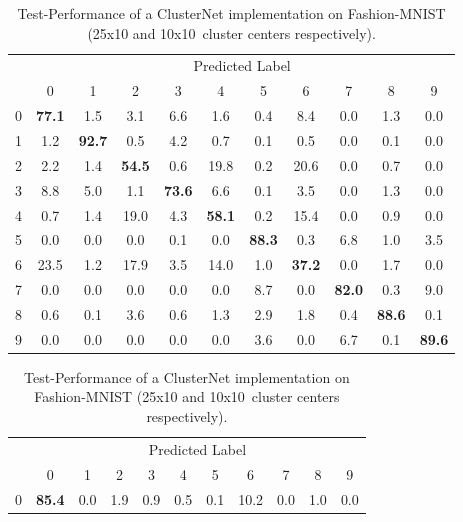 \documentclass{article}
\begin{document}
\begin{table}[hbt!]
    \caption{Test-Performance of a ClusterNet implementation on Fashion-MNIST (25x10 and 10x10~cluster centers respectively).}
    \begin{subtable}{0.5\linewidth}
        \centering
        \scriptsize
        \tabcolsep=0.11cm
        \begin{tabular}{c| c c c c c c c c c c |}
            & \multicolumn{10}{c}{Predicted Label} \\
            & 0 & 1 & 2 & 3 & 4 & 5 & 6 & 7 & 8 & 9 \\ 
          \hline
            0 & \textbf{77.1} & 1.5 & 3.1 & 6.6 & 1.6 & 0.4 & 8.4 & 0.0 & 1.3 & 0.0 \\
            1 & 1.2 & \textbf{92.7} & 0.5 & 4.2 & 0.7 & 0.1 & 0.5 & 0.0 & 0.1 & 0.0 \\
            2 & 2.2 & 1.4 & \textbf{54.5} & 0.6 & 19.8 & 0.2 & 20.6 & 0.0 & 0.7 & 0.0 \\
            3 & 8.8 & 5.0 & 1.1 & \textbf{73.6} & 6.6 & 0.1 & 3.5 & 0.0 & 1.3 & 0.0 \\
            4 & 0.7 & 1.4 & 19.0 & 4.3 & \textbf{58.1} & 0.2 & 15.4 & 0.0 & 0.9 & 0.0 \\
            5 & 0.0 & 0.0 & 0.0 & 0.1 & 0.0 & \textbf{88.3} & 0.3 & 6.8 & 1.0 & 3.5 \\
            6 & 23.5 & 1.2 & 17.9 & 3.5 & 14.0 & 1.0 & \textbf{37.2} & 0.0 & 1.7 & 0.0 \\
            7 & 0.0 & 0.0 & 0.0 & 0.0 & 0.0 & 8.7 & 0.0 & \textbf{82.0} & 0.3 & 9.0 \\
            8 & 0.6 & 0.1 & 3.6 & 0.6 & 1.3 & 2.9 & 1.8 & 0.4 & \textbf{88.6} & 0.1 \\
            9 & 0.0 & 0.0 & 0.0 & 0.0 & 0.0 & 3.6 & 0.0 & 6.7 & 0.1 & \textbf{89.6}
        \end{tabular}
         \label{tab:fmnist1}
  \end{subtable}
  \begin{subtable}{0.5\linewidth}
        \centering
        \scriptsize
        \tabcolsep=0.11cm
        \begin{tabular}{c| c c c c c c c c c c |}
            & \multicolumn{10}{c}{Predicted Label} \\
            & 0 & 1 & 2 & 3 & 4 & 5 & 6 & 7 & 8 & 9\\ 
          \hline
            0 & \textbf{85.4} & 0.0 & 1.9 & 0.9 & 0.5 & 0.1 & 10.2 & 0.0 & 1.0 & 0.0 \\

\end{tabular}
\end{subtable}
\end{table}
\end{document}
